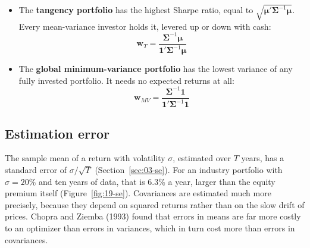 \begin{itemize}
  \item The \textbf{tangency portfolio} has the highest Sharpe ratio, equal to $\sqrt{\boldsymbol{\mu}'\boldsymbol{\Sigma}^{-1}\boldsymbol{\mu}}$. Every mean-variance investor holds it, levered up or down with cash:
  \begin{equation}
    \mathbf{w}_T = \frac{\boldsymbol{\Sigma}^{-1}\boldsymbol{\mu}}{\mathbf{1}'\boldsymbol{\Sigma}^{-1}\boldsymbol{\mu}}
    \label{eq:19-tangency}
  \end{equation}
  \item The \textbf{global minimum-variance portfolio} has the lowest variance of any fully invested portfolio. It needs no expected returns at all:
  \begin{equation}
    \mathbf{w}_{MV} = \frac{\boldsymbol{\Sigma}^{-1}\mathbf{1}}{\mathbf{1}'\boldsymbol{\Sigma}^{-1}\mathbf{1}}
    \label{eq:19-minvar}
  \end{equation}
\end{itemize}

\subsection{Estimation error}

The sample mean of a return with volatility $\sigma$, estimated over $T$ years, has a standard error of $\sigma/\sqrt{T}$ (Section~\ref{sec:03-se}). For an industry portfolio with $\sigma = 20\%$ and ten years of data, that is 6.3\% a year, larger than the equity premium itself (Figure~\ref{fig:19-se}). Covariances are estimated much more precisely, because they depend on squared returns rather than on the slow drift of prices. Chopra and Ziemba (1993) found that errors in means are far more costly to an optimizer than errors in variances, which in turn cost more than errors in covariances.

